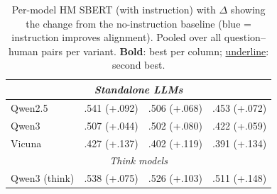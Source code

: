 \begin{table}[h]
\begin{tabular}{lccc}
\midrule
\multicolumn{4}{c}{\textit{Standalone LLMs}} \\
\midrule
Qwen2.5 & .541 {(\textcolor[HTML]{0072B2}{+.092})} & .506 {(\textcolor[HTML]{0072B2}{+.068})} & .453 {(\textcolor[HTML]{0072B2}{+.072})} \\
Qwen3 & .507 {(\textcolor[HTML]{0072B2}{+.044})} & .502 {(\textcolor[HTML]{0072B2}{+.080})} & .422 {(\textcolor[HTML]{0072B2}{+.059})} \\
Vicuna & .427 {(\textcolor[HTML]{0072B2}{+.137})} & .402 {(\textcolor[HTML]{0072B2}{+.119})} & .391 {(\textcolor[HTML]{0072B2}{+.134})} \\
\midrule
\multicolumn{4}{c}{\textit{Think models}} \\
\midrule
Qwen3 (think) & .538 {(\textcolor[HTML]{0072B2}{+.075})} & .526 {(\textcolor[HTML]{0072B2}{+.103})} & .511 {(\textcolor[HTML]{0072B2}{+.148})} \\
\bottomrule
\end{tabular}
\caption{Per-model HM SBERT (with instruction) with $\Delta$ showing the change from the no-instruction baseline (\textcolor[HTML]{0072B2}{blue} = instruction improves alignment). Pooled over all question--human pairs per variant. \textbf{Bold}: best per column; \underline{underline}: second best.}
\label{tab:sbert_inst_effect}
\end{table}
